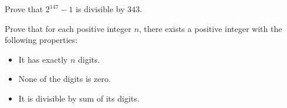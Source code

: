 \documentclass{subfile}
\begin{document}

	\begin{problem}
		Prove that $2^{147}-1$ is divisible by $343.$ %
	\end{problem}


	\begin{problem}[ISL 1998, NT7]
		Prove that for each positive integer $n$, there exists a positive integer with the following properties:
			\begin{itemize}
				\item It has exactly $n$ digits.
				\item None of the digits is zero.
				\item It is divisible by sum of its digits.
			\end{itemize}
	\end{problem}
\end{document}
